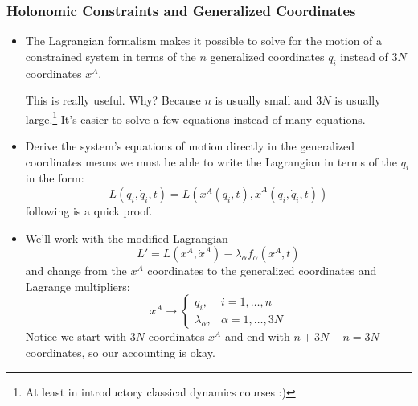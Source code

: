 \documentclass[11pt, a4paper]{article}
\begin{document}
\subsubsection{Holonomic Constraints and Generalized Coordinates}
\begin{itemize}
	\item The Lagrangian formalism makes it possible to solve for the motion of a constrained system in terms of the $ n $ generalized coordinates $ q_{i} $ instead of $ 3N $ coordinates $ x^{A} $. 
	
	This is really useful. Why? Because $ n $ is usually small and $ 3N $ is usually large.\footnote{At least in introductory classical dynamics courses :)} It's easier to solve a few equations instead of many equations. 
	
	\item Derive the system's equations of motion directly in the generalized coordinates means we must be able to write the Lagrangian in terms of the $ q_{i} $ in the form:
	\begin{equation*}
		L(q_i, \dot{q}_i, t) = L\left (x^{A}(q_i, t), \dot{x}^{A}(q_i, \dot{q}_i, t)\right )
	\end{equation*}
	following is a quick proof.
	
	\item We'll work with the modified Lagrangian 
	\begin{equation*}
		L' = L(x^{A}, \dot{x}^{A}) - \lambda_{\alpha}f_{\alpha}(x^{A}, t) 
	\end{equation*}
	and change from the $ x^{A} $ coordinates to the generalized coordinates and Lagrange multipliers:
	\begin{equation*}
		x^{A} \to 
		\begin{cases}
			q_{i}, & i = 1, \ldots, n\\
			\lambda_{\alpha}, & \alpha = 1, \ldots, 3N
		\end{cases}
	\end{equation*}
	Notice we start with $ 3N $ coordinates $ x^{A} $ and end with $ n + 3N - n = 3N $ coordinates, so our accounting is okay.
	

\end{itemize}
\end{document}
